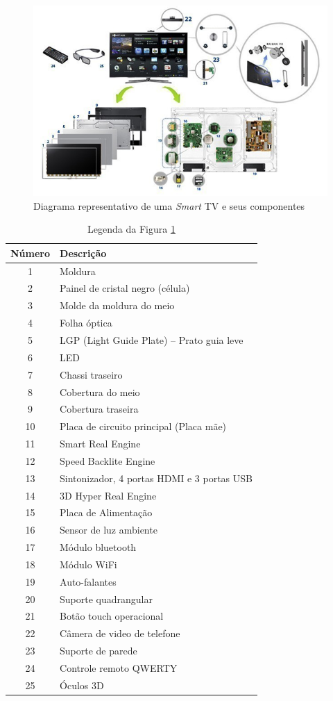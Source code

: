 \begin{figure}
	\includegraphics[width=\textwidth]{img/smart_samsung.jpg}
	\caption{Diagrama representativo de uma \emph{Smart} TV e seus componentes \cite{samsung:smarttv}}
	\label{fig:smart_samsung}
\end{figure}

\begin{table}[t]
	\centering
	\caption{Legenda da Figura \ref{fig:smart_samsung}}
	\label{tab:smart}
	\begin{tabular}{c l}
		\hline
		Número & Descrição \\
		\hline
		1 & Moldura \\
		2 & Painel de cristal negro (célula) \\
		3 & Molde da moldura do meio \\
		4 & Folha óptica \\
		5 & LGP (Light Guide Plate) -- Prato guia leve \\
		6 & LED \\
		7 & Chassi traseiro \\
		8 & Cobertura do meio \\
		9 & Cobertura traseira \\
		10 & Placa de circuito principal (Placa mãe) \\
		11 & Smart Real Engine \\
		12 & Speed Backlite Engine \\
		13 & Sintonizador, 4 portas HDMI e 3 portas USB \\
		14 & 3D Hyper Real Engine \\
		15 & Placa de Alimentação \\
		16 & Sensor de luz ambiente \\
		17 & Módulo bluetooth \\
		18 & Módulo WiFi \\
		19 & Auto-falantes \\
		20 & Suporte quadrangular \\
		21 & Botão touch operacional \\
		22 & Câmera de video de telefone \\
		23 & Suporte de parede \\
		24 & Controle remoto QWERTY \\
		25 & Óculos 3D \\
		\hline
	\end{tabular}
\end{table}



